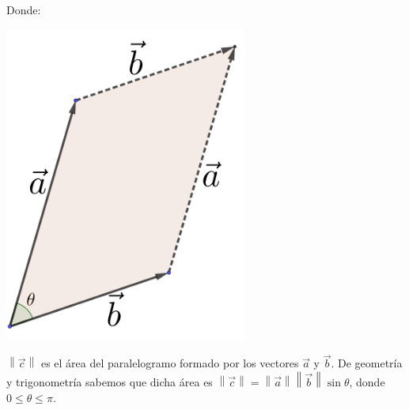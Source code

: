 \documentclass[12pt, fleqn]{report}                             %
\theoremstyle{break}                                            %
\newcommand{\Abs}[1]    {\left\lVert #1 \right\lVert}           %
\begin{document}
                Donde: 

                \begin{minipage}{0.30\textwidth}
                    \includegraphics[width=0.60\textwidth]{parallelogram}
                \end{minipage}
                \begin{minipage}[t]{.65\textwidth}

                    $\Abs{\vec{c}}$ es el área del paralelogramo formado por los vectores $\vec{a}$ y $\vec{b}$.
                    De geometría y trigonometría sabemos que dicha área es 
                    $\Abs{\vec{c}} = \Abs{\vec{a}} \Abs{\vec{b}} \sin \theta$, donde $0 \leq \theta \leq \pi$.

                \end{minipage}

                \vspace{2em}
                
\end{document}
